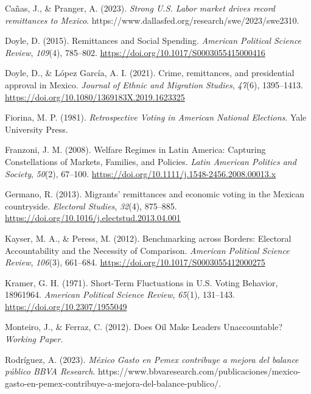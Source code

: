 \documentclass[
]{article}
\newlength{\cslhangindent}
\newlength{\cslentryspacingunit} %
\newenvironment{CSLReferences}[2] %
 {%
  \setlength{\parindent}{0pt}
  \ifodd #1
  \let\oldpar\par
  \def\par{\hangindent=\cslhangindent\oldpar}
  \fi
  \setlength{\parskip}{#2\cslentryspacingunit}
 }%
 {}
\begin{document}
\begin{CSLReferences}{1}{0}
\leavevmode{}%
Cañas, J., \& Pranger, A. (2023). \emph{Strong {U}.{S}. Labor market
drives record remittances to {Mexico}}.
https://www.dallasfed.org/research/swe/2023/swe2310.

\leavevmode{}%
Doyle, D. (2015). Remittances and {Social Spending}. \emph{American
Political Science Review}, \emph{109}(4), 785--802.
\url{https://doi.org/10.1017/S0003055415000416}

\leavevmode{}%
Doyle, D., \& López García, A. I. (2021). Crime, remittances, and
presidential approval in {Mexico}. \emph{Journal of Ethnic and Migration
Studies}, \emph{47}(6), 1395--1413.
\url{https://doi.org/10.1080/1369183X.2019.1623325}

\leavevmode{}%
Fiorina, M. P. (1981). \emph{Retrospective {Voting} in {American
National Elections}}. {Yale University Press}.

\leavevmode{}%
Franzoni, J. M. (2008). Welfare {Regimes} in {Latin America}: {Capturing
Constellations} of {Markets}, {Families}, and {Policies}. \emph{Latin
American Politics and Society}, \emph{50}(2), 67--100.
\url{https://doi.org/10.1111/j.1548-2456.2008.00013.x}

\leavevmode{}%
Germano, R. (2013). Migrants' remittances and economic voting in the
{Mexican} countryside. \emph{Electoral Studies}, \emph{32}(4), 875--885.
\url{https://doi.org/10.1016/j.electstud.2013.04.001}

\leavevmode{}%
Kayser, M. A., \& Peress, M. (2012). Benchmarking across {Borders}:
{Electoral Accountability} and the {Necessity} of {Comparison}.
\emph{American Political Science Review}, \emph{106}(3), 661--684.
\url{https://doi.org/10.1017/S0003055412000275}

\leavevmode{}%
Kramer, G. H. (1971). Short-{Term Fluctuations} in {U}.{S}. {Voting
Behavior}, 1896{\textendash}1964. \emph{American Political Science
Review}, \emph{65}(1), 131--143. \url{https://doi.org/10.2307/1955049}

\leavevmode{}%
Monteiro, J., \& Ferraz, C. (2012). Does {Oil Make Leaders
Unaccountable}? \emph{Working Paper}.

\leavevmode{}%
Rodríguez, A. (2023). \emph{{M{é}xico \textbar{} Gasto en Pemex
contribuye a mejora del balance p{ú}blico \textbar{} BBVA Research}}.
https://www.bbvaresearch.com/publicaciones/mexico-gasto-en-pemex-contribuye-a-mejora-del-balance-publico/.


\end{CSLReferences}
\end{document}
